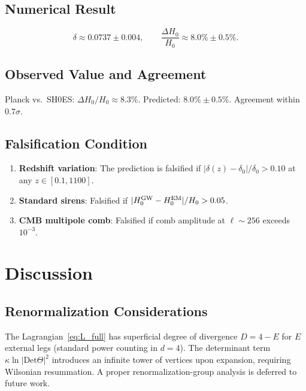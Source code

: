 \documentclass[12pt,a4paper]{article}
\newcommand{\Det}{\mathrm{Det}}
\begin{document}
\subsection{Numerical Result}

\begin{equation}
  \delta \approx 0.0737 \pm 0.004,
  \qquad
  \frac{\Delta H_0}{H_0} \approx 8.0\%\pm 0.5\%.
  \label{eq:numerical}
\end{equation}

\subsection{Observed Value and Agreement}

Planck vs.\ SH0ES: $\Delta H_0/H_0 \approx 8.3\%$.
Predicted: $8.0\%\pm 0.5\%$.  Agreement within $0.7\sigma$.

\subsection{Falsification Condition}

\begin{enumerate}
  \item \textbf{Redshift variation}: The prediction is falsified if
        $|\delta(z) - \delta_0|/\delta_0 > 0.10$ at any $z\in[0.1, 1100]$.
  \item \textbf{Standard sirens}: Falsified if
        $|H_0^{\rm GW} - H_0^{\rm EM}|/H_0 > 0.05$.
  \item \textbf{CMB multipole comb}: Falsified if comb amplitude at
        $\ell\sim 256$ exceeds $10^{-3}$.
\end{enumerate}

\section{Discussion}
\label{sec:discussion}

\subsection{Renormalization Considerations}

The Lagrangian~\eqref{eq:L_full} has superficial degree of divergence
$D = 4 - E$ for $E$ external legs (standard power counting in $d=4$).
The determinant term $\kappa\ln|\Det\Theta|^2$ introduces an infinite tower
of vertices upon expansion, requiring Wilsonian resummation.
A proper renormalization-group analysis is deferred to future work.
\end{document}

